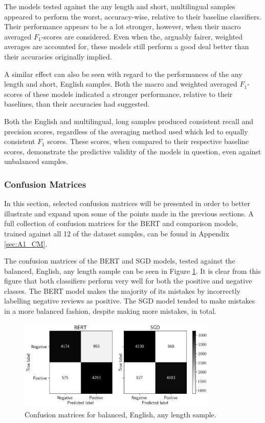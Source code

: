 The models tested against the any length and short, multilingual samples appeared to perform the worst, accuracy-wise, relative to their baseline classifiers. Their performance appears to be a lot stronger, however, when their macro averaged $F_1$-scores are considered. Even when the, arguably fairer, weighted averages are accounted for, these models still perform a good deal better than their accuracies originally implied.

A similar effect can also be seen with regard to the performances of the any length and short, English samples. Both the macro and weighted averaged $F_1$-scores of these models indicated a stronger performance, relative to their baselines, than their accuracies had suggested.

Both the English and multilingual, long samples produced consistent recall and precision scores, regardless of the averaging method used which led to equally consistent $F_1$ scores. These scores, when compared to their respective baseline scores, demonstrate the predictive validity of the models in question, even against unbalanced samples.

\subsubsection{Confusion Matrices}

In this section, selected confusion matrices will be presented in order to better illustrate and expand upon some of the points made in the previous sections. A full collection of confusion matrices for the BERT and comparison models, trained against all 12 of the dataset samples, can be found in Appendix \ref{sec:A1_CM}.

The confusion matrices of the BERT and SGD models, tested against the balanced, English, any length sample can be seen in Figure \ref{fig:Res_RF_Pol_CM_EBA}. It is clear from this figure that both classifiers perform very well for both the positive and negative classes. The BERT model makes the majority of its mistakes by incorrectly labelling negative reviews as positive. The SGD model tended to make mistakes in a more balanced fashion, despite making more mistakes, in total.

\begin{figure}[ht]
    \centering
    \includegraphics[width=0.85\textwidth]{figures/06_results/01_rfp/01_pol/01_cm/eng_eq_any.png}
    \caption{Confusion matrices for balanced, English, any length sample.}
    \label{fig:Res_RF_Pol_CM_EBA}
\end{figure}

